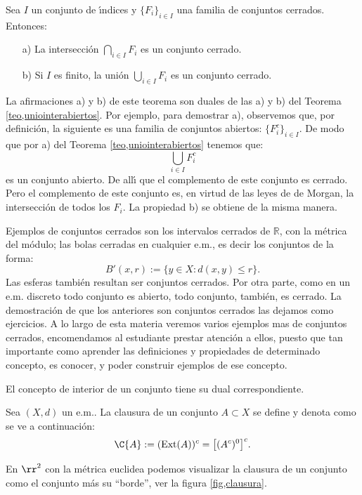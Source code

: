 \begin{teorema}\label{teo,uniointercerrados} Sea $I$ un conjunto de \'{\i}ndices y
$\{F_i\}_{i\in I}$ una familia de conjuntos cerrados. Entonces:
\begin{itemize}
\item[a)] La intersecci\'on $\bigcap_{i\in I}F_i$ es un conjunto cerrado.
\item[b)] Si $I$ es finito, la uni\'on $\bigcup_{i\in
I}F_i$ es un conjunto cerrado.
\end{itemize}
\end{teorema}
\begin{demo} La afirmaciones a) y b) de este teorema son duales de
las a) y b) del Teorema \vref{teo,uniointerabiertos}. Por ejemplo,
para demostrar a), observemos que, por definici\'on, la siguiente
es una familia de conjuntos abiertos: $\{F_i^c\}_{i\in I}$. De
modo que por a) del Teorema \vref{teo,uniointerabiertos} tenemos
que:
\[\bigcup\limits_{i\in I}F_i^c\]
es un conjunto abierto. De all\'{\i} que el complemento de este
conjunto es cerrado. Pero el complemento de este conjunto es, en
virtud de las leyes de de Morgan, la intersecci\'on de todos los
$F_i$. La propiedad b) se obtiene de la misma manera.
\end{demo}

Ejemplos de conjuntos cerrados son los intervalos cerrados de
$\mathbb{R}$, con la m\'etrica del m\'odulo; las bolas cerradas en
cualquier e.m., es decir los conjuntos de la forma:
\[B'(x,r):=\{y\in X: d(x,y)\leq r\}.\]
Las esferas tambi\'en resultan ser conjuntos cerrados. Por otra
parte, como en un e.m. discreto todo conjunto es abierto, todo
conjunto, tambi\'en, es cerrado. La demostraci\'on de que los
anteriores son conjuntos cerrados las dejamos como ejercicios. A
lo largo de esta materia veremos varios ejemplos mas de conjuntos
cerrados, encomendamos al estudiante prestar atenci\'on a ellos,
puesto que tan importante como aprender las definiciones y
propiedades de determinado concepto, es conocer, y poder construir
ejemplos de ese concepto.

El concepto de interior de un conjunto tiene su dual
correspondiente.
\begin{definicion} Sea $(X,d)$ un e.m.. La clausura de un conjunto $A\subset
X$ se define y denota como se ve a continuaci\'on:
\[\C{A}:=(\text{Ext}(A))^c=\bigl[(A^c)^0\bigr]^c.\]
\end{definicion}

 En $\rr^2$ con la m\'etrica euclidea podemos visualizar la
clausura de un conjunto  como el conjunto m\'as su ``borde'', ver
la figura \vref{fig,clausura}.

